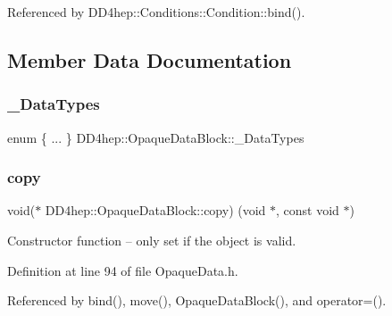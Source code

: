 Referenced by D\+D4hep\+::\+Conditions\+::\+Condition\+::bind().



\subsection{Member Data Documentation}
\hypertarget{class_d_d4hep_1_1_opaque_data_block_a0e431bafd05dde4afeba30aab68e8930}{}\label{class_d_d4hep_1_1_opaque_data_block_a0e431bafd05dde4afeba30aab68e8930} 
\subsubsection{\texorpdfstring{\+\_\+\+Data\+Types}{\_DataTypes}}
{\footnotesize\ttfamily enum \{ ... \}   D\+D4hep\+::\+Opaque\+Data\+Block\+::\+\_\+\+Data\+Types\hspace{0.3cm}{\ttfamily [private]}}

\hypertarget{class_d_d4hep_1_1_opaque_data_block_a824e5874b1243b34bf57fee30e09f524}{}\label{class_d_d4hep_1_1_opaque_data_block_a824e5874b1243b34bf57fee30e09f524} 
\subsubsection{\texorpdfstring{copy}{copy}}
{\footnotesize\ttfamily void($\ast$ D\+D4hep\+::\+Opaque\+Data\+Block\+::copy) (void $\ast$, const void $\ast$)\hspace{0.3cm}{\ttfamily [private]}}



Constructor function -- only set if the object is valid. 



Definition at line 94 of file Opaque\+Data.\+h.



Referenced by bind(), move(), Opaque\+Data\+Block(), and operator=().

\hypertarget{class_d_d4hep_1_1_opaque_data_block_a200e53deafdc5f74aadd47e066357c04}{}\label{class_d_d4hep_1_1_opaque_data_block_a200e53deafdc5f74aadd47e066357c04} 
